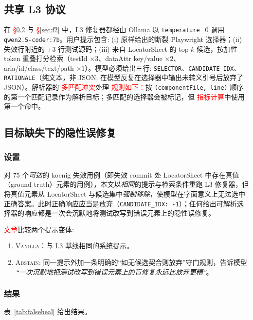 \documentclass[UTF8, a4paper, 10.5pt, twocolumn, fontset=none]{ctexart}
\providecommand{\DIFaddbegin}{} %
\providecommand{\DIFaddend}{} %
\providecommand{\DIFaddtex}[1]{\textcolor{red}{#1}} %
\providecommand{\DIFadd}[1]{\texorpdfstring{\DIFaddtex{#1}}{#1}} %
\providecommand{\DIFaddincludegraphics}[2][]{{\color{blue}\fbox{\DIFOincludegraphics[#1]{#2}}}} %
\DeclareRobustCommand{\DIFaddbegin}{\DIFOaddbegin \let\includegraphics\DIFaddincludegraphics} %
\DeclareRobustCommand{\DIFaddend}{\DIFOaddend \let\includegraphics\DIFOincludegraphics} %
\begin{document}
\subsection{共享 L3 协议}
在  \DIFaddbegin \DIFadd{\S\ref{sec:f1} }\DIFaddend 与  \DIFaddbegin \DIFadd{\S\ref{sec:f2} }\DIFaddend 中，L3 修复器都经由 Ollama 以 \texttt{temperature\DIFaddbegin }\DIFaddend =0  调用 \texttt{qwen2.5-coder:7b}。用户提示包含: (i) 原样给出的断裂 Playwright 选择器；(ii) 失效行附近的 $\pm 3$ 行测试源码；(iii) 来自 LocatorSheet 的 top-$k$ 候选，按加性 token 重叠打分检索（testId $\times 3$、dataAttr key/value $\times 2$、aria/id/class/text/path $\times 1$）。模型必须给出三行: \texttt{SELECTOR}、\texttt{CANDIDATE\_IDX}、\texttt{RATIONALE}（纯文本，非 JSON: 在模型反复在选择器中输出未转义引号后放弃了 JSON）。解析器的 \DIFaddbegin \DIFadd{多匹配冲突}\DIFaddend 处理 \DIFaddbegin \DIFadd{规则如下：}\DIFaddend 按 \texttt{(componentFile, line)} 顺序的第一个匹配记录作为解析目标；多匹配的选择器会被标记，但 \DIFaddbegin \DIFadd{指标计算}\DIFaddend 中使用第一个命中。

\subsection{ 目标缺失下的隐性误修复}
\label{sec:f1}

\subsubsection{设置}
对 75 个\emph{可达}的 koenig 失效用例（即失效 commit 处 LocatorSheet 中存在真值（ground truth）元素的用例），本文以\emph{相同}的提示与检索条件重跑 L3 修复器，但将真值元素从 LocatorSheet 与候选集中\emph{强制移除}，使模型在字面意义上无法选中正确答案。此时正确响应应当是放弃（\texttt{CANDIDATE\_IDX: -1}）；任何给出可解析选择器的响应都是一次会沉默地将测试改写到错误元素上的隐性误修复。

 \DIFaddbegin \DIFadd{文章}\DIFaddend 比较两个提示变体:
\begin{enumerate}
\item \textsc{Vanilla}：与 L3 基线相同的系统提示。
\item \textsc{Abstain}: 同一提示外加一条明确的“如无候选契合则放弃”守门规则，告诉模型 \emph{“一次沉默地把测试改写到错误元素上的盲修复永远比放弃更糟”}。
\end{enumerate}

\subsubsection{结果}
表~\ref{tab:falseheal} 给出结果。
\end{document}

